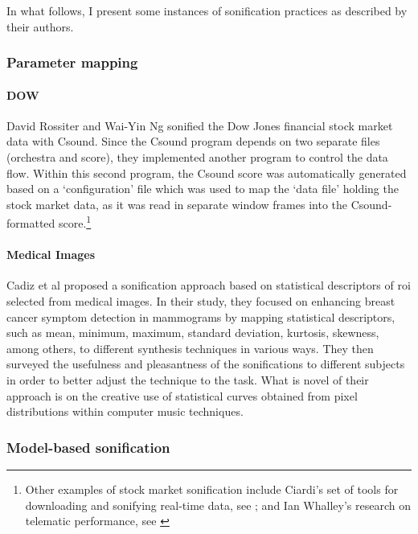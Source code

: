 In what follows, I present some instances of sonification practices as described by their authors.

\subsubsection{Parameter mapping}
\label{sonification:parametermapping}

\paragraph{DOW}
David Rossiter and Wai-Yin Ng \parencite{icmc/bbp2372.1996.085} sonified the Dow Jones financial stock market data with Csound. Since the Csound program depends on two separate files (orchestra and score), they implemented another program to control the data flow. Within this second program, the Csound score was automatically generated based on a `configuration' file which was used to map the `data file' holding the stock market data, as it was read in separate window frames into the Csound-formatted score.\footnote{Other examples of stock market sonification include Ciardi's set of tools for downloading and sonifying real-time data, see \parencite{icmc/bbp2372.2004.124}; and Ian Whalley's research on telematic performance, see \parencite{icmc/bbp2372.2014.046}}

\paragraph{Medical Images}
Cadiz et al \parencite{DBLP:conf/icmc/CadizCMMATI15} proposed a sonification approach based on statistical descriptors of \gls{roi} selected from medical images. In their study, they focused on enhancing breast cancer symptom detection in mammograms by mapping statistical descriptors, such as mean, minimum, maximum, standard deviation, kurtosis, skewness, among others, to different synthesis techniques in various ways. They then surveyed the usefulness and pleasantness of the sonifications to different subjects in order to better adjust the technique to the task. What is novel of their approach is on the creative use of statistical curves obtained from pixel distributions within computer music techniques.

\subsubsection{Model-based sonification}
\label{sonification:model}


